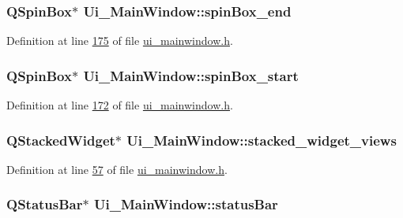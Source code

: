 \hypertarget{a00027_a8ebeb5caa10878d7806d1f548913b449}{
\subsubsection[{spin\+Box\+\_\+end}]{\setlength{\rightskip}{0pt plus 5cm}Q\+Spin\+Box$\ast$ Ui\+\_\+\+Main\+Window\+::spin\+Box\+\_\+end}}\label{a00027_a8ebeb5caa10878d7806d1f548913b449}


Definition at line \hyperlink{a00052_source_l00175}{175} of file \hyperlink{a00052_source}{ui\+\_\+mainwindow.\+h}.

\hypertarget{a00027_acb4d6609c580645dac5aee1f1ad59d01}{
\subsubsection[{spin\+Box\+\_\+start}]{\setlength{\rightskip}{0pt plus 5cm}Q\+Spin\+Box$\ast$ Ui\+\_\+\+Main\+Window\+::spin\+Box\+\_\+start}}\label{a00027_acb4d6609c580645dac5aee1f1ad59d01}


Definition at line \hyperlink{a00052_source_l00172}{172} of file \hyperlink{a00052_source}{ui\+\_\+mainwindow.\+h}.

\hypertarget{a00027_a59e39bd3d716004e840a5be5dda18b96}{
\subsubsection[{stacked\+\_\+widget\+\_\+views}]{\setlength{\rightskip}{0pt plus 5cm}Q\+Stacked\+Widget$\ast$ Ui\+\_\+\+Main\+Window\+::stacked\+\_\+widget\+\_\+views}}\label{a00027_a59e39bd3d716004e840a5be5dda18b96}


Definition at line \hyperlink{a00052_source_l00057}{57} of file \hyperlink{a00052_source}{ui\+\_\+mainwindow.\+h}.

\hypertarget{a00027_a50fa481337604bcc8bf68de18ab16ecd}{
\subsubsection[{status\+Bar}]{\setlength{\rightskip}{0pt plus 5cm}Q\+Status\+Bar$\ast$ Ui\+\_\+\+Main\+Window\+::status\+Bar}}\label{a00027_a50fa481337604bcc8bf68de18ab16ecd}


